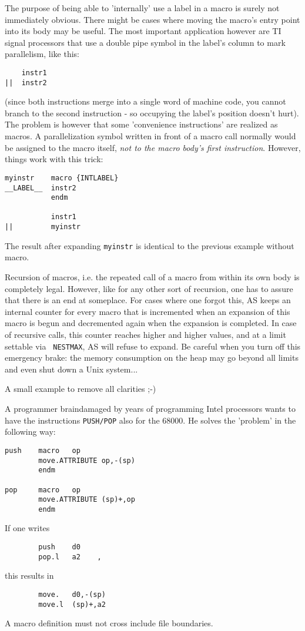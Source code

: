 \documentclass[12pt,twoside]{report}
\newcommand{\tty}[1]{{\tt #1}}
\newcommand{\asname}{{AS}}
\begin{document}
The purpose of being able to 'internally' use a label in a macro is surely
not immediately obvious.  There might be cases where moving the macro's
entry point into its body may be useful.  The most important application
however are TI signal processors that use a double pipe symbol in the
label's column to mark parallelism, like this:
\begin{verbatim}
    instr1
||  instr2
\end{verbatim}
(since both instructions merge into a single word of machine code, you
cannot branch to the second instruction - so occupying the label's
position doesn't hurt).  The problem is however that some 'convenience
instructions' are realized as macros.  A parallelization symbol written in
front of a macro call normally would be assigned to the macro itself, {\it
not to the macro body's first instruction}.  However, things work with
this trick:
\begin{verbatim}
myinstr    macro {INTLABEL}
__LABEL__  instr2
           endm

           instr1
||         myinstr
\end{verbatim}
The result after expanding {\tt myinstr} is identical to the previous
example without macro.

Recursion of macros, i.e. the repeated call of a macro from within its own
body is completely legal.  However, like for any other sort of recursion,
one has to assure that there is an end at someplace.  For cases where one
forgot this, \asname{} keeps an internal counter for every macro that is
incremented when an expansion of this macro is begun and decremented again
when the expansion is completed.  In case of recursive calls, this counter
reaches higher and higher values, and at a limit settable via {\tt
NESTMAX}, \asname{} will refuse to expand. Be careful when you turn off this
emergency brake: the memory consumption on the heap may go beyond all
limits and even shut down a Unix system...

A small example to remove all clarities ;-)

A programmer braindamaged by years of programming Intel processors
wants to have the instructions \tty{PUSH/POP} also for the 68000.  He
solves the 'problem' in the following way:
\begin{verbatim}
push    macro   op
        move.ATTRIBUTE op,-(sp)
        endm

pop     macro   op
        move.ATTRIBUTE (sp)+,op
        endm
\end{verbatim}
If one writes
\begin{verbatim}
        push    d0
        pop.l   a2    ,
\end{verbatim}
this results in
\begin{verbatim}
        move.   d0,-(sp)
        move.l  (sp)+,a2
\end{verbatim}
A macro definition must not cross include file boundaries.
\end{document}
